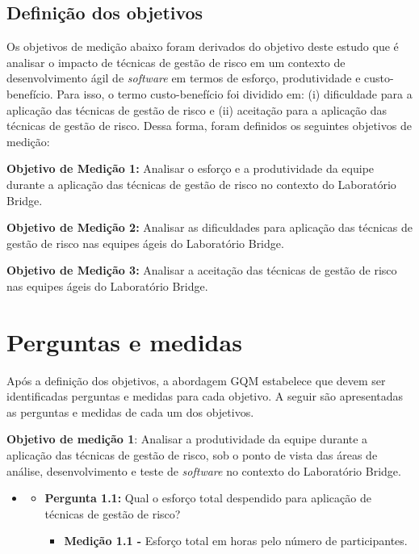 \documentclass[
    12pt,       %
    openright,      %
    twoside,      %
    a4paper,      %
    english,      %
    french,       %
    spanish,      %
    brazil,       %
    ]{abntex2}
\begin{document}
\subsection{Definição dos objetivos}

Os objetivos de medição abaixo foram derivados do objetivo deste estudo que é analisar o impacto de técnicas de gestão de risco em um contexto de desenvolvimento ágil de \textit{software} em termos de esforço, produtividade e custo-benefício. Para isso, o termo custo-benefício foi dividido em: (i) dificuldade para a aplicação das técnicas de gestão de risco e (ii) aceitação para a aplicação das técnicas de gestão de risco. Dessa forma, foram definidos os seguintes objetivos de medição:

\textbf{Objetivo de Medição 1:} Analisar o esforço e a produtividade da equipe durante a aplicação das técnicas de gestão de risco no contexto do Laboratório Bridge.

\textbf{Objetivo de Medição 2:} Analisar as dificuldades para aplicação das técnicas de gestão de risco nas equipes ágeis do Laboratório Bridge.

\textbf{Objetivo de Medição 3:} Analisar a aceitação das técnicas de gestão de risco nas equipes ágeis do Laboratório Bridge.

\section{Perguntas e medidas}

Após a definição dos objetivos, a abordagem GQM \cite{KOZIOLEK:2005} estabelece que devem ser identificadas perguntas e medidas para cada objetivo. A seguir são apresentadas as perguntas e medidas de cada um dos objetivos. 

\textbf{Objetivo de medição 1}: Analisar a produtividade da equipe durante a aplicação das técnicas de gestão de risco, sob o ponto de vista das áreas de análise, desenvolvimento e teste de \textit{software} no contexto do Laboratório Bridge.

\begin{itemize}[label={}]
\item
\begin{itemize}
        \item \textbf{Pergunta 1.1:} Qual o esforço total despendido para aplicação de técnicas de gestão de risco?
            \begin{itemize}[label={}]
                \item \textbf{Medição 1.1 - } Esforço total em horas pelo número de participantes.
            \end{itemize}
     
\end{itemize}
\end{itemize}
\end{document}
